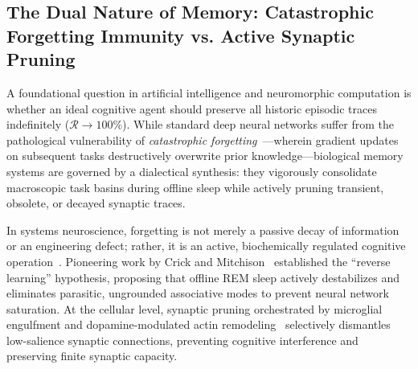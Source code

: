 \documentclass[10pt,twocolumn,3p]{article}
\begin{document}
\subsection{The Dual Nature of Memory: Catastrophic Forgetting Immunity vs. Active Synaptic Pruning}
\label{subsec:dual_memory_nature}

A foundational question in artificial intelligence and neuromorphic computation is whether an ideal cognitive agent should preserve all historic episodic traces indefinitely ($\mathcal{R} \to 100\%$). While standard deep neural networks suffer from the pathological vulnerability of \textit{catastrophic forgetting}~\cite{mccloskey1989,french1999,kirkpatrick2017}---wherein gradient updates on subsequent tasks destructively overwrite prior knowledge---biological memory systems are governed by a dialectical synthesis: they vigorously consolidate macroscopic task basins during offline sleep while actively pruning transient, obsolete, or decayed synaptic traces.

In systems neuroscience, forgetting is not merely a passive decay of information or an engineering defect; rather, it is an active, biochemically regulated cognitive operation~\cite{davis2017,hardt2013}. Pioneering work by Crick and Mitchison~\cite{crick1983} established the ``reverse learning'' hypothesis, proposing that offline REM sleep actively destabilizes and eliminates parasitic, ungrounded associative modes to prevent neural network saturation. At the cellular level, synaptic pruning orchestrated by microglial engulfment and dopamine-modulated actin remodeling~\cite{paolicelli2011,davis2017} selectively dismantles low-salience synaptic connections, preventing cognitive interference and preserving finite synaptic capacity.
\end{document}
